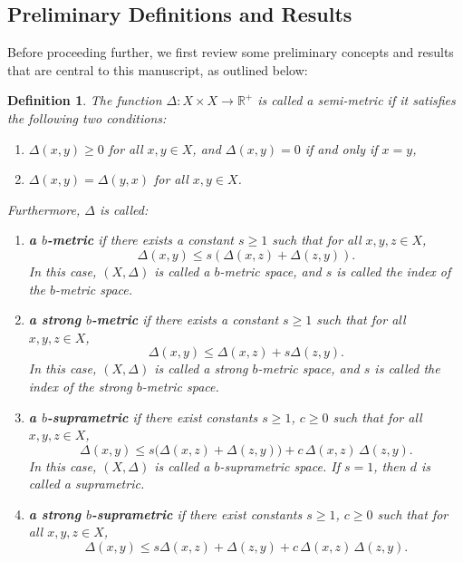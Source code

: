 \documentclass[pdflatex,sn-mathphys-num]{sn-jnl}%
\theoremstyle{thmstyleone}%
\theoremstyle{thmstyletwo}%
\theoremstyle{thmstylethree}%
\newtheorem{definition}{Definition}%
\begin{document}
\subsection{Preliminary Definitions and Results}
Before proceeding further, we first review some preliminary concepts and results that are central to this manuscript, as outlined below:

\begin{definition}\label{metrics}
The function \( \Delta: X \times X \to \mathbb{R}^{+} \) is called a semi-metric if it satisfies the following two conditions:
\begin{enumerate}
    \item \( \Delta(x, y) \geq 0 \) for all \( x, y \in X \), and \( \Delta(x, y) = 0 \) if and only if \( x = y \),
    \item \( \Delta(x, y) = \Delta(y, x) \) for all \( x, y \in X \).
\end{enumerate}
Furthermore, \( \Delta\) is called:
\begin{enumerate}[resume]
    \item \textbf{a \( b \)-metric} if there exists a constant \( s \geq 1 \) such that for all \( x, y, z \in X \),
    \[
    \Delta(x, y) \leq s \left( \Delta(x, z) + \Delta(z, y) \right).
    \]
    In this case, \( (X, \Delta) \) is called a \( b \)-metric space, and \( s \) is called the index of the \( b \)-metric space.
    \item \textbf{a strong \( b \)-metric} if there exists a constant \( s \geq 1 \) such that for all \( x, y, z \in X \),
    \[
    \Delta(x, y) \leq \Delta(x, z) + s \Delta(z, y).
    \]
    In this case, \( (X, \Delta) \) is called a strong \( b \)-metric space, and \( s \) is called the index of the strong \( b \)-metric space.
    \item \textbf{a \( b \)-suprametric} if there exist constants \( s \geq 1 \), \( c \geq 0 \) such that for all \( x, y, z \in X \),
    \[
    \Delta(x, y) \leq s \big( \Delta(x, z) + \Delta(z, y) \big) + c \, \Delta(x, z) \, \Delta(z, y).
    \]
    In this case, \( (X, \Delta) \) is called a \( b \)-suprametric space. If \( s = 1 \), then \( d \) is called a suprametric.
    \item \textbf{a strong \( b \)-suprametric} if there exist constants \( s \geq 1 \), \( c \geq 0 \) such that for all \( x, y, z \in X \),
    \begin{equation}\label{defbsupra}
    \Delta(x, y) \leq s \Delta(x, z) + \Delta(z, y) + c \, \Delta(x, z) \, \Delta(z, y).
    \end{equation}

\end{enumerate}
\end{definition}
\end{document}
